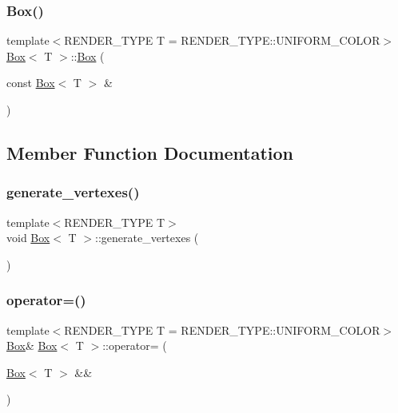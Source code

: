 \subsubsection{\texorpdfstring{Box()}{Box()}\hspace{0.1cm}{\footnotesize\ttfamily [3/3]}}
{\footnotesize\ttfamily template$<$R\+E\+N\+D\+E\+R\+\_\+\+T\+Y\+PE T = R\+E\+N\+D\+E\+R\+\_\+\+T\+Y\+P\+E\+::\+U\+N\+I\+F\+O\+R\+M\+\_\+\+C\+O\+L\+OR$>$ \\
\mbox{\hyperlink{classBox}{Box}}$<$ T $>$\+::\mbox{\hyperlink{classBox}{Box}} (\begin{DoxyParamCaption}\item[{const \mbox{\hyperlink{classBox}{Box}}$<$ T $>$ \&}]{ }\end{DoxyParamCaption})\hspace{0.3cm}{\ttfamily [default]}}



\subsection{Member Function Documentation}
\mbox{\label{classBox_a7f7b061bf913f9ab47bff75536bc137d}} 
\subsubsection{\texorpdfstring{generate\+\_\+vertexes()}{generate\_vertexes()}}
{\footnotesize\ttfamily template$<$R\+E\+N\+D\+E\+R\+\_\+\+T\+Y\+PE T$>$ \\
void \mbox{\hyperlink{classBox}{Box}}$<$ T $>$\+::generate\+\_\+vertexes (\begin{DoxyParamCaption}{ }\end{DoxyParamCaption})\hspace{0.3cm}{\ttfamily [private]}}

\mbox{\label{classBox_a09995e3360b336b8a477d84804a5a70d}} 
\subsubsection{\texorpdfstring{operator=()}{operator=()}\hspace{0.1cm}{\footnotesize\ttfamily [1/2]}}
{\footnotesize\ttfamily template$<$R\+E\+N\+D\+E\+R\+\_\+\+T\+Y\+PE T = R\+E\+N\+D\+E\+R\+\_\+\+T\+Y\+P\+E\+::\+U\+N\+I\+F\+O\+R\+M\+\_\+\+C\+O\+L\+OR$>$ \\
\mbox{\hyperlink{classBox}{Box}}\& \mbox{\hyperlink{classBox}{Box}}$<$ T $>$\+::operator= (\begin{DoxyParamCaption}\item[{\mbox{\hyperlink{classBox}{Box}}$<$ T $>$ \&\&}]{ }\end{DoxyParamCaption})\hspace{0.3cm}{\ttfamily [default]}}

